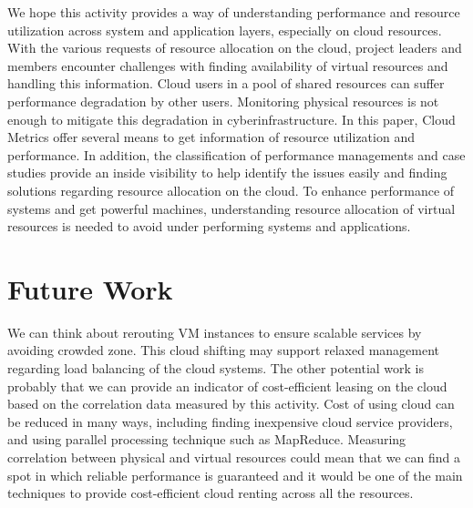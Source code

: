 \documentclass{sig-alternate-05-2015}
\begin{document}
We hope this activity provides a way of understanding performance and resource utilization across system and application layers, especially on cloud resources. With the various requests of resource allocation on the cloud, project leaders and members encounter challenges with finding availability of virtual resources and handling this information. Cloud users in a pool of shared resources can suffer performance degradation by other users. Monitoring physical resources is not enough to mitigate this degradation in cyberinfrastructure. In this paper, Cloud Metrics offer several means to get information of resource utilization and performance. In addition, the classification of performance managements and case studies provide an inside visibility to help identify the issues easily and finding solutions regarding resource allocation on the cloud. To enhance performance of systems and get powerful machines, understanding resource allocation of virtual resources is needed to avoid under performing systems and applications.


\section{Future Work}

We can think about rerouting VM instances to ensure scalable services by avoiding crowded zone. This cloud shifting may support relaxed management regarding load balancing of the cloud systems. The other potential work is probably that we can provide an indicator of cost-efficient leasing on the cloud based on the correlation data measured by this activity. Cost of using cloud can be reduced in many ways, including finding inexpensive cloud service providers, and using parallel processing technique such as MapReduce. Measuring correlation between physical and virtual resources could mean that we can find a spot in which reliable performance is guaranteed and it would be one of the main techniques to provide cost-efficient cloud renting across all the resources.


\end{document}
